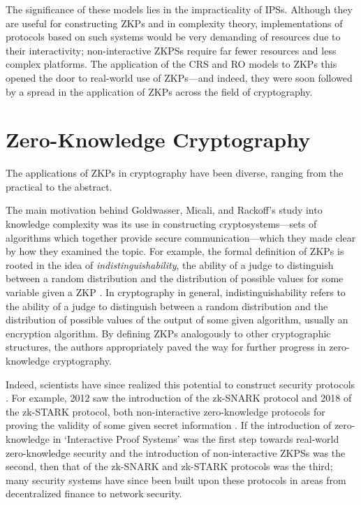 \documentclass{article}
\begin{document}
The significance of these models lies in the impracticality of IPSs. Although they are useful for constructing ZKPs and in complexity theory, implementations of protocols based on such systems would be very demanding of resources due to their interactivity; non-interactive ZKPSs require far fewer resources and less complex platforms. The application of the CRS and RO models to ZKPs this opened the door to real-world use of ZKPs---and indeed, they were soon followed by a spread in the application of ZKPs across the field of cryptography.


\section{Zero-Knowledge Cryptography}

The applications of ZKPs in cryptography have been diverse, ranging from the practical to the abstract.

The main motivation behind Goldwasser, Micali, and Rackoff's study into knowledge complexity was its use in constructing cryptosystems---sets of algorithms which together provide secure communication---which they made clear by how they examined the topic. For example, the formal definition of ZKPs is rooted in the idea of \textit{indistinguishability}, the ability of a judge to distinguish between a random distribution and the distribution of possible values for some variable given a ZKP \cite{GMR}. In cryptography in general, indistinguishability refers to the ability of a judge to distinguish between a random distribution and the distribution of possible values of the output of some given algorithm, usually an encryption algorithm. By defining ZKPs analogously to other cryptographic structures, the authors appropriately paved the way for further progress in zero-knowledge cryptography.

Indeed, scientists have since realized this potential to construct security protocols \cite{GMR}. For example, 2012 saw the introduction of the zk-SNARK protocol and 2018 of the zk-STARK protocol, both non-interactive zero-knowledge protocols for proving the validity of some given secret information \cite{BGPS}. If the introduction of zero-knowledge in `Interactive Proof Systems' was the first step towards real-world zero-knowledge security and the introduction of non-interactive ZKPSs was the second, then that of the zk-SNARK and zk-STARK protocols was the third; many security systems have since been built upon these protocols in areas from decentralized finance to network security.
\end{document}
